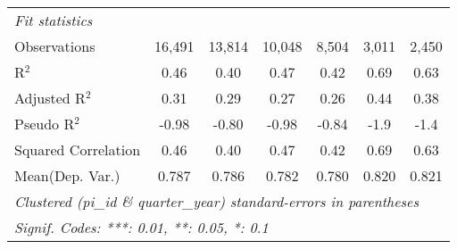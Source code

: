 \begin{tabular}{lcccccc}
   \midrule
   \emph{Fit statistics}\\
   Observations                                               & 16,491         & 13,814         & 10,048        & 8,504        & 3,011   & 2,450\\  
   R$^2$                                                      & 0.46           & 0.40           & 0.47          & 0.42         & 0.69    & 0.63\\  
   Adjusted R$^2$                                             & 0.31           & 0.29           & 0.27          & 0.26         & 0.44    & 0.38\\  
   Pseudo R$^2$                                               & -0.98          & -0.80          & -0.98         & -0.84        & -1.9    & -1.4\\  
   Squared Correlation                                        & 0.46           & 0.40           & 0.47          & 0.42         & 0.69    & 0.63\\  
Mean(Dep. Var.) & 0.787 & 0.786 & 0.782 & 0.780 & 0.820 & 0.821 \\
   \midrule \midrule
   \multicolumn{7}{l}{\emph{Clustered (pi\_id \& quarter\_year) standard-errors in parentheses}}\\
   \multicolumn{7}{l}{\emph{Signif. Codes: ***: 0.01, **: 0.05, *: 0.1}}\\
\end{tabular}
\par\endgroup
